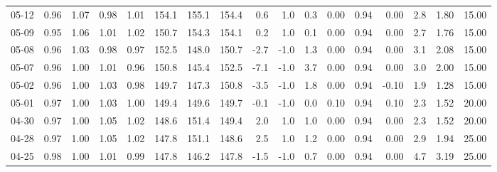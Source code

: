 \begin{threeparttable}
{\begin{tabular}{lrrrrrrrrrrrrrrrr}
  05-12 &         0.96 &           1.07 &          0.98 &          1.01 & 154.1 & 155.1 & 154.4 &        0.6 &                      1.0 &                 0.3 &       0.00 &      0.94 &           0.00 &              2.8 &            1.80 &                  15.00 \\
  05-09 &         0.95 &           1.06 &          1.01 &          1.02 & 150.7 & 154.3 & 154.1 &        0.2 &                      1.0 &                 0.1 &       0.00 &      0.94 &           0.00 &              2.7 &            1.76 &                  15.00 \\
  05-08 &         0.96 &           1.03 &          0.98 &          0.97 & 152.5 & 148.0 & 150.7 &       -2.7 &                     -1.0 &                 1.3 &       0.00 &      0.94 &           0.00 &              3.1 &            2.08 &                  15.00 \\
  05-07 &         0.96 &           1.00 &          1.01 &          0.96 & 150.8 & 145.4 & 152.5 &       -7.1 &                     -1.0 &                 3.7 &       0.00 &      0.94 &           0.00 &              3.0 &            2.00 &                  15.00 \\
  05-02 &         0.96 &           1.00 &          1.03 &          0.98 & 149.7 & 147.3 & 150.8 &       -3.5 &                     -1.0 &                 1.8 &       0.00 &      0.94 &          -0.10 &              1.9 &            1.28 &                  15.00 \\
  05-01 &         0.97 &           1.00 &          1.03 &          1.00 & 149.4 & 149.6 & 149.7 &       -0.1 &                     -1.0 &                 0.0 &       0.10 &      0.94 &           0.10 &              2.3 &            1.52 &                  20.00 \\
  04-30 &         0.97 &           1.00 &          1.05 &          1.02 & 148.6 & 151.4 & 149.4 &        2.0 &                      1.0 &                 1.0 &       0.00 &      0.94 &           0.00 &              2.3 &            1.52 &                  20.00 \\
  04-28 &         0.97 &           1.00 &          1.05 &          1.02 & 147.8 & 151.1 & 148.6 &        2.5 &                      1.0 &                 1.2 &       0.00 &      0.94 &           0.00 &              2.9 &            1.94 &                  25.00 \\
  04-25 &         0.98 &           1.00 &          1.01 &          0.99 & 147.8 & 146.2 & 147.8 &       -1.5 &                     -1.0 &                 0.7 &       0.00 &      0.94 &           0.00 &              4.7 &            3.19 &                  25.00 \\

\end{tabular}}
\end{threeparttable}
